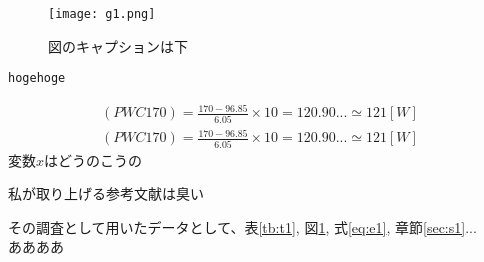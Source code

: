 \documentclass[dvipdfmx]{jsarticle}
\begin{document}
    \begin{figure}[H]
        \begin{center}
            \texttt{[image: g1.png]} %
            \caption{図のキャプションは下\label{fig:g1}}
        \end{center}
    \end{figure}

    \begin{lstlisting}[basicstyle=\ttfamily\footnotesize, frame=single]
hogehoge
    \end{lstlisting}

    \begin{align}
        \label{eq:e1}
        (PWC170) = \frac{170 - 96.85}{6.05} \times 10 = 120.90... \simeq 121 [W]\\ %
        (PWC170) = \frac{170 - 96.85}{6.05} \times 10 = 120.90... \simeq 121 [W]
    \end{align}
    $ 変数x $はどうのこうの

    私が取り上げる参考文献\cite{YJ1919}は臭い

    その調査として用いたデータとして、表\ref{tb:t1}, 図\ref{fig:g1}, 式\ref{eq:e1}, 章節\ref{sec:s1}...\\
    ああああ %

    
\end{document}
